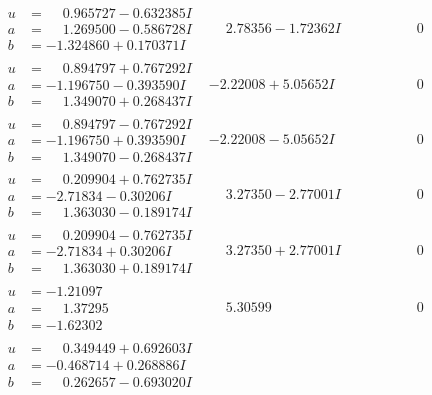 \documentclass[1p]{elsarticle_modified}
\theoremstyle{definition}
\begin{document}
$$\begin{array}{c|c|c}
\begin{aligned}
u &= \phantom{-}0.965727 - 0.632385 I \\
a &= \phantom{-}1.269500 - 0.586728 I \\
b &= -1.324860 + 0.170371 I\end{aligned}
 & \phantom{-}2.78356 - 1.72362 I & \phantom{-0.000000 } 0 \\ \hline\begin{aligned}
u &= \phantom{-}0.894797 + 0.767292 I \\
a &= -1.196750 - 0.393590 I \\
b &= \phantom{-}1.349070 + 0.268437 I\end{aligned}
 & -2.22008 + 5.05652 I & \phantom{-0.000000 } 0 \\ \hline\begin{aligned}
u &= \phantom{-}0.894797 - 0.767292 I \\
a &= -1.196750 + 0.393590 I \\
b &= \phantom{-}1.349070 - 0.268437 I\end{aligned}
 & -2.22008 - 5.05652 I & \phantom{-0.000000 } 0 \\ \hline\begin{aligned}
u &= \phantom{-}0.209904 + 0.762735 I \\
a &= -2.71834 - 0.30206 I \\
b &= \phantom{-}1.363030 - 0.189174 I\end{aligned}
 & \phantom{-}3.27350 - 2.77001 I & \phantom{-0.000000 } 0 \\ \hline\begin{aligned}
u &= \phantom{-}0.209904 - 0.762735 I \\
a &= -2.71834 + 0.30206 I \\
b &= \phantom{-}1.363030 + 0.189174 I\end{aligned}
 & \phantom{-}3.27350 + 2.77001 I & \phantom{-0.000000 } 0 \\ \hline\begin{aligned}
u &= -1.21097\phantom{ +0.000000I} \\
a &= \phantom{-}1.37295\phantom{ +0.000000I} \\
b &= -1.62302\phantom{ +0.000000I}\end{aligned}
 & \phantom{-}5.30599\phantom{ +0.000000I} & \phantom{-0.000000 } 0 \\ \hline\begin{aligned}
u &= \phantom{-}0.349449 + 0.692603 I \\
a &= -0.468714 + 0.268886 I \\
b &= \phantom{-}0.262657 - 0.693020 I\end{aligned}

\end{array}$$
\end{document}
